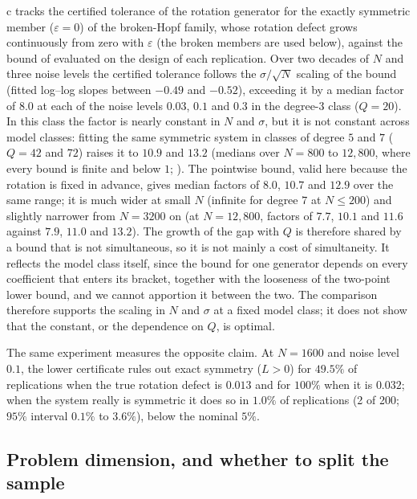 c tracks the certified tolerance of the rotation generator
for the exactly symmetric
member ($\varepsilon = 0$) of the broken-Hopf family, whose rotation defect
grows continuously from zero with $\varepsilon$ (the broken members are used
below), against the bound of  evaluated on the design of each
replication. Over two decades of $N$ and three noise levels the certified
tolerance follows the $\sigma/\sqrt N$ scaling of the bound (fitted log--log
slopes between $-0.49$ and $-0.52$), exceeding it by a median factor of $8.0$
at each of the noise levels $0.03$, $0.1$ and $0.3$ in the degree-$3$ class
($Q = 20$). In this class the factor is nearly constant in $N$ and $\sigma$,
but it is not constant across model classes: fitting the same symmetric
system in classes of degree $5$ and $7$ ($Q = 42$ and $72$) raises it to
$10.9$ and $13.2$ (medians over $N = 800$ to $12{,}800$, where every bound is
finite and below $1$; \STqsweep). The pointwise bound, valid here because the
rotation is fixed in advance, gives median factors of $8.0$, $10.7$ and $12.9$
over the same range; it is much wider at small $N$ (infinite for degree $7$ at
$N \le 200$) and slightly narrower from $N = 3200$ on (at $N = 12{,}800$,
factors of $7.7$, $10.1$ and $11.6$ against $7.9$, $11.0$ and $13.2$). The
growth of the gap with $Q$ is therefore shared by a bound that is not
simultaneous, so it is not mainly a cost of simultaneity. It reflects the
model class itself, since the bound for one generator depends on every
coefficient that enters its bracket, together with the looseness of the
two-point lower bound, and we cannot apportion it between the two. The
comparison therefore supports the scaling in $N$ and $\sigma$ at a fixed model
class; it does not show that the constant, or the dependence on $Q$, is
optimal.

The same experiment measures the opposite claim. At $N=1600$ and noise level
$0.1$, the lower certificate rules out exact symmetry ($L > 0$) for
$49.5\%$ of replications when the true rotation defect is $0.013$ and for
$100\%$ when it is $0.032$; when the system really is symmetric it does so in
$1.0\%$ of replications (2 of 200; $95\%$ interval $0.1\%$ to $3.6\%$), below
the nominal $5\%$.

\subsection{Problem dimension, and whether to split the sample}
\label{sec:dimension}


